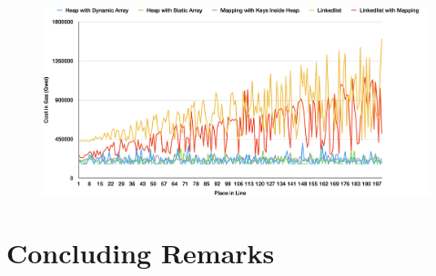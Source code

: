 
\begin{figure}[htb!p]
\centering
\includegraphics[width=1\textwidth]{fig/average_case_submission_3.png}
\caption{\footnotesize{}  \label{fig:average_case_submission}}
\end{figure}

















\section{Concluding Remarks}


 

































